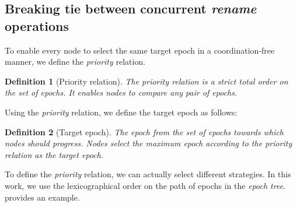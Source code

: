 \documentclass[10pt,journal,compsoc]{IEEEtran}
\newtheorem{definition}{Definition}
\begin{document}
\subsection{Breaking tie between concurrent \emph{rename} operations}
\label{sec:priority}

To enable every node to select the same target epoch in a coordination-free manner, we define the \emph{priority} relation.

\begin{definition}[Priority relation]
    The \emph{priority} relation is a strict total order on the set of epochs.
    It enables nodes to compare any pair of epochs.
\end{definition}

Using the \emph{priority} relation, we define the target epoch as follows:

\begin{definition}[Target epoch]
    The epoch from the set of epochs towards which nodes should progress.
    Nodes select the maximum epoch according to the \emph{priority} relation as the target epoch.
\end{definition}

To define the \emph{priority} relation, we can actually select different strategies.
In this work, we use the lexicographical order on the path of epochs in the \emph{epoch tree}.
 provides an example.
\end{document}
